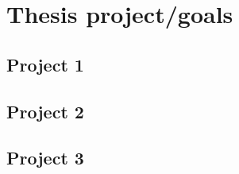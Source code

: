 \section{Thesis project/goals}


\subsection{Project 1}
\subsection{Project 2}
\subsection{Project 3}
